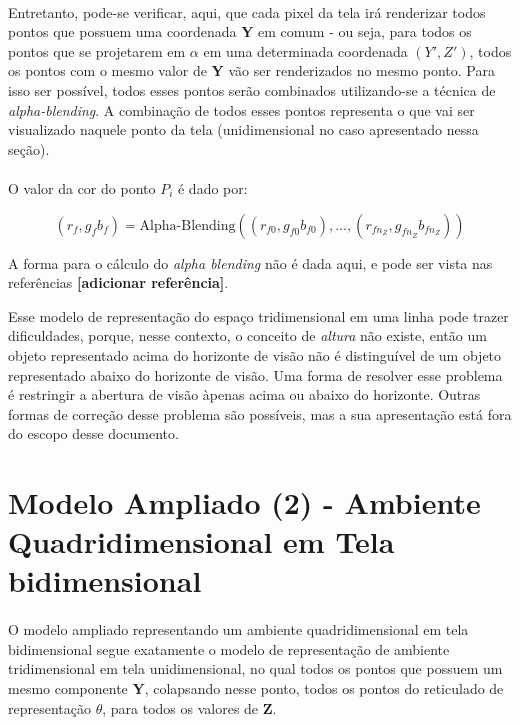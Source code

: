\documentclass{article}
\begin{document}
	\paragraph{}
	Entretanto, pode-se verificar, aqui, que cada pixel da tela irá renderizar todos pontos que possuem uma coordenada \textbf{Y} em comum - ou seja, para todos os pontos que se projetarem em $\alpha$ em uma determinada coordenada $(Y',Z')$, todos os pontos com o mesmo valor de \textbf{Y} vão ser renderizados no mesmo ponto. Para isso ser possível, todos esses pontos serão combinados utilizando-se a técnica de \textit{alpha-blending}. A combinação de todos esses pontos representa o que vai ser visualizado naquele ponto da tela (unidimensional no caso apresentado nessa seção).
	
	\paragraph{}
	O valor da cor do ponto $P_i$ é dado por:
	
	\begin{equation}
		(r_f, g_f b_f) = \text{Alpha-Blending}\left((r_{f0}, g_{f0} b_{f0}), ..., (r_{fn_Z}, g_{fn_Z} b_{fn_Z})\right)
	\end{equation}

	A forma para o cálculo do \textit{alpha blending} não é dada aqui, e pode ser vista nas referências \textbf{[adicionar referência]}.
	
	Esse modelo de representação do espaço tridimensional em uma linha pode trazer dificuldades, porque, nesse contexto, o conceito de \textit{altura} não existe, então um objeto representado acima do horizonte de visão não é distinguível de um objeto representado abaixo do horizonte de visão. Uma forma de resolver esse problema é restringir a abertura de visão àpenas acima ou abaixo do horizonte. Outras formas de correção desse problema são possíveis, mas a sua apresentação está fora do escopo desse documento.
	
	\section{Modelo Ampliado (2) - Ambiente Quadridimensional em Tela bidimensional}
	
	\paragraph{}
	O modelo ampliado representando um ambiente quadridimensional em tela bidimensional segue exatamente o modelo de representação de ambiente tridimensional em tela unidimensional, no qual todos os pontos que possuem um mesmo componente \textbf{Y}, colapsando nesse ponto, todos os pontos do reticulado de representação $\theta$, para todos os valores de \textbf{Z}.
	
\end{document}
